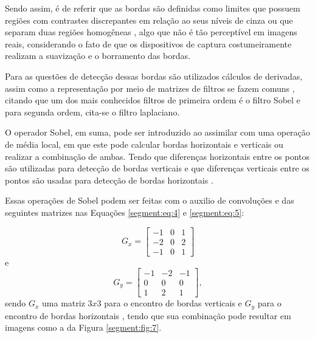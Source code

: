 Sendo assim, é de referir que as bordas são definidas como limites que possuem regiões com contrastes discrepantes em relação ao seus níveis de cinza  ou que separam duas regiões homogêneas \cite{pedrini2008analise,Yuheng2017}, algo que não é tão perceptível em imagens reais, considerando o fato de que os dispositivos de captura costumeiramente realizam a suavização e o borramento das bordas.

Para as questões de detecção dessas bordas são utilizados cálculos de derivadas, assim  como a representação por meio de matrizes de filtros se fazem comuns \cite{pedrini2008analise, muthukrishnan2011edge}, citando que um dos mais conhecidos filtros de primeira ordem é o filtro Sobel e para segunda ordem, cita-se o filtro laplaciano.

O operador Sobel, em suma, pode ser introduzido ao assimilar com uma operação de média local, em que este pode calcular bordas horizontais e verticais ou realizar a combinação de ambas. Tendo que diferenças horizontais entre os pontos são utilizadas para detecção de bordas verticais e que diferenças verticais entre os pontos são usadas para detecção de bordas horizontais \cite{pedrini2008analise}.

Essas operações de Sobel podem ser feitas com o auxilio de convoluções e das seguintes matrizes nas Equações \ref{segment:eq:4} e \ref{segment:eq:5}:

\begin{equation}
\label{segment:eq:4}
    G_x = \begin{bmatrix}
    -1 & 0 & 1 \\ 
    -2 & 0 & 2 \\ 
    -1 & 0 & 1
    \end{bmatrix}
\end{equation}
e
\begin{equation}
\label{segment:eq:5}
    G_y = \begin{bmatrix}
    -1 & -2 & -1 \\ 
     0 & 0 & 0 \\ 
     1 & 2 & 1
    \end{bmatrix},
\end{equation}
sendo $G_x$ uma matriz $3x3$ para o encontro de bordas verticais e $G_y$ para o encontro de bordas horizontais \cite{pedrini2008analise}, tendo que sua combinação pode resultar em imagens como a da Figura \ref{segment:fig:7}.

